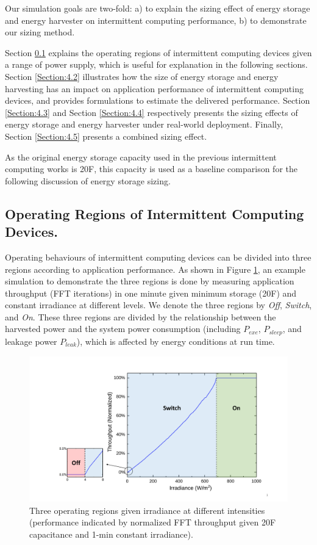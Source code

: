 Our simulation goals are two-fold: a) to explain the sizing effect of energy storage and energy harvester on intermittent computing performance, b) to demonstrate our sizing method. 

Section \ref{Section:4.1} explains the operating regions of intermittent computing devices given a range of power supply, which is useful for explanation in the following sections. Section \ref{Section:4.2} illustrates how the size of energy storage and energy harvesting has an impact on application performance of intermittent computing devices, and provides formulations to estimate the delivered performance. Section \ref{Section:4.3} and Section \ref{Section:4.4} respectively presents the sizing effects of energy storage and energy harvester under real-world deployment. Finally, Section \ref{Section:4.5} presents a combined sizing effect.

As the original energy storage capacity used in the previous intermittent computing works is 20\textmu F, this capacity is used as a baseline comparison for the following discussion of energy storage sizing.

\subsection{Operating Regions of Intermittent Computing Devices.} \label{Section:4.1}

Operating behaviours of intermittent computing devices can be divided into three regions according to application performance. As shown in Figure \ref{Figure:varyG}, an example simulation to demonstrate the three regions is done by measuring application throughput (FFT iterations) in one minute given minimum storage (20\textmu F) and constant irradiance at different levels. We denote the three regions by \textit{Off}, \textit{Switch}, and \textit{On}. These three regions are divided by the relationship between the harvested power and the system power consumption (including $P_{exe}$, $P_{sleep}$, and leakage power $P_{leak}$), which is affected by energy conditions at run time. 

\begin{figure}[H]
    \centering
    \includegraphics[width=12cm]{figure/work1/varyG}
    \caption{Three operating regions given irradiance at different intensities (performance indicated by normalized FFT throughput given 20\textmu F capacitance and 1-min constant irradiance).}
    \label{Figure:varyG}
\end{figure}

